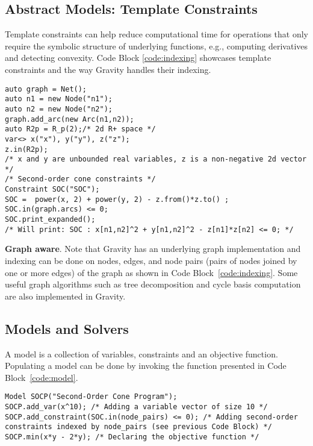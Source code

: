 \documentclass{article}
\newcommand{\Gravity}{{\sc Gravity}}
\begin{document}
\subsection{Abstract Models: Template Constraints}
Template constraints can help reduce computational time for operations that only require the symbolic structure of underlying functions, e.g., computing derivatives and detecting convexity. Code Block \ref{code:indexing} showcases template constraints and the way \Gravity{} handles their indexing.
\begin{code}[h!]
\caption{Template Constraints in \Gravity{}}
\begin{verbatim}
auto graph = Net();
auto n1 = new Node("n1");
auto n2 = new Node("n2");
graph.add_arc(new Arc(n1,n2));
auto R2p = R_p(2);/* 2d R+ space */
var<> x("x"), y("y"), z("z");
z.in(R2p);
/* x and y are unbounded real variables, z is a non-negative 2d vector */
/* Second-order cone constraints */
Constraint SOC("SOC");
SOC =  power(x, 2) + power(y, 2) - z.from()*z.to() ;
SOC.in(graph.arcs) <= 0;
SOC.print_expanded(); 
/* Will print: SOC : x[n1,n2]^2 + y[n1,n2]^2 - z[n1]*z[n2] <= 0; */
\end{verbatim}
\label{code:indexing}
\end{code}

{\bf Graph aware}.
Note that \Gravity{} has an underlying graph implementation and indexing can be done on nodes, edges, and node pairs (pairs of nodes joined by one or more edges) of the graph as shown in Code Block~\ref{code:indexing}. Some useful graph algorithms such as tree decomposition and cycle basis computation are also implemented in \Gravity.
\subsection{Models and Solvers}
A model is a collection of variables, constraints and an objective function. Populating a model can be done by invoking the function presented in Code Block~\ref{code:model}.
\begin{code}[h!]
\caption{Model Declaration}
\begin{verbatim}
Model SOCP("Second-Order Cone Program");
SOCP.add_var(x^10); /* Adding a variable vector of size 10 */
SOCP.add_constraint(SOC.in(node_pairs) <= 0); /* Adding second-order 
constraints indexed by node_pairs (see previous Code Block) */
SOCP.min(x*y - 2*y); /* Declaring the objective function */
\end{verbatim}
\label{code:model}
\end{code}
\end{document}
